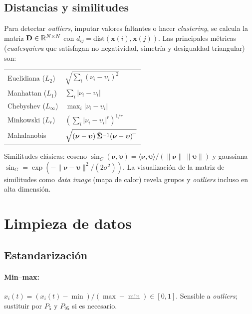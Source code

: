 \subsection{Distancias y similitudes}

Para detectar \emph{outliers}, imputar valores faltantes o hacer
\emph{clustering}, se calcula la matriz $\mathbf{D}\in\mathbb{R}^{N\times N}$
con $d_{ij}=\mathrm{dist}(\mathbf{x}(i),\mathbf{x}(j))$. Las
principales métricas (\emph{cualesquiera} que satisfagan no
negatividad, simetría y desigualdad triangular) son:

\begin{center}\small
\begin{tabular}{@{}l l@{}}
\toprule
Euclidiana ($L_2$) & $\sqrt{\sum_i (\nu_i-\upsilon_i)^2}$ \\
Manhattan ($L_1$) & $\sum_i |\nu_i-\upsilon_i|$ \\
Chebyshev ($L_\infty$) & $\max_i |\nu_i-\upsilon_i|$ \\
Minkowski ($L_r$) & $(\sum_i |\nu_i-\upsilon_i|^r)^{1/r}$ \\
Mahalanobis & $\sqrt{(\boldsymbol\nu-\boldsymbol\upsilon)\,
                     \hat{\boldsymbol{\Sigma}}^{-1}
                     (\boldsymbol\nu-\boldsymbol\upsilon)^{\!\top}}$ \\
\bottomrule
\end{tabular}
\end{center}

Similitudes clásicas: coseno
$\sin_C(\boldsymbol\nu,\boldsymbol\upsilon)=
\langle\boldsymbol\nu,\boldsymbol\upsilon\rangle/
(\|\boldsymbol\nu\|\,\|\boldsymbol\upsilon\|)$ y gaussiana
$\sin_G=\exp(-\|\boldsymbol\nu-\boldsymbol\upsilon\|^2/(2\sigma^2))$. La
visualización de la matriz de similitudes como \emph{data image} (mapa
de calor) revela grupos y \emph{outliers} incluso en alta dimensión.

\section{Limpieza de datos}

\subsection{Estandarización}

\paragraph{Min--max:} $\hat{x}_i(t)=(x_i(t)-\min)/(\max-\min)\in[0,1]$.
Sensible a \emph{outliers}; sustituir por $P_5$ y $P_{95}$ si es
necesario.

